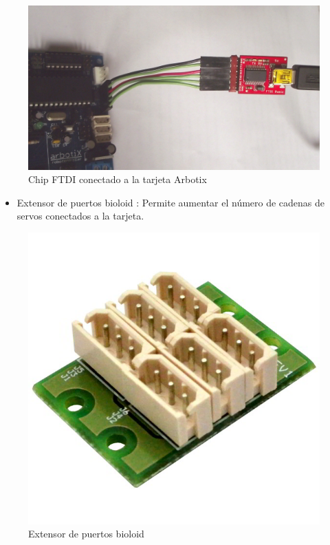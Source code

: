 \begin{figure}[hbtp]
\centering
\includegraphics[scale=0.09]{imagenes/DSCF1162.jpg}
\caption{Chip FTDI conectado a la tarjeta Arbotix}
\end{figure}

\begin{itemize}
\item Extensor de puertos bioloid : Permite aumentar el número de cadenas de servos conectados a la tarjeta. \cite{hub} 
\end{itemize}

\begin{figure}[hbtp]
\centering
\includegraphics[scale=0.3]{imagenes/Dynamixel-AX-MX-6-Port-Extension-Hub-600x600.jpg}
\caption{Extensor de puertos bioloid}
\end{figure}

